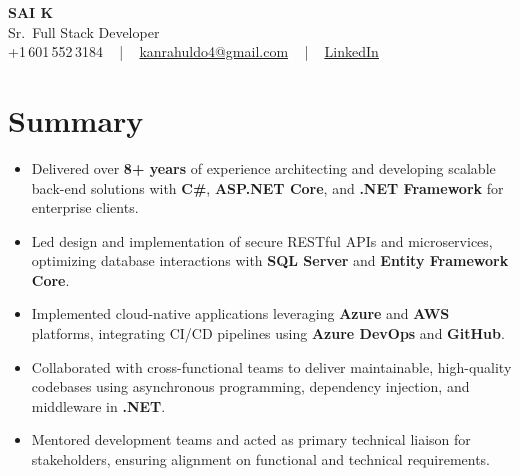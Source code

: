 \documentclass[letterpaper,11pt]{article}
\newcommand{\resumeItem}[1]{
  \item\footnotesize{
    {#1 \vspace{-2pt}}
  }
}
\newcommand{\resumeItemListStart}{\begin{itemize}[leftmargin=*]}
\newcommand{\resumeItemListEnd}{\end{itemize}\vspace{-5pt}}
\begin{document}
\begin{center}
    {\fontsize{14pt}{12pt}\selectfont \textbf{\MakeUppercase{Sai K}}}\\ \vspace{2pt}
    \fontsize{10pt}{12pt}\selectfont Sr.\ Full Stack Developer\\ \vspace{2pt}
    \fontsize{10pt}{12pt}\selectfont +1\,601\,552\,3184 ~ | ~
    \href{mailto:kanrahuldo4@gmail.com}{kanrahuldo4@gmail.com} ~ | ~
    \href{https://www.linkedin.com/in/srrrk/}{\color{blue}\underline{LinkedIn}}
    \vspace{-10pt}
\end{center}

\section{Summary}
\fontsize{9pt}{10pt}\selectfont
\resumeItemListStart
  \resumeItem{Delivered over \textbf{8+ years} of experience architecting and developing scalable back-end solutions with \textbf{C\#}, \textbf{ASP.NET Core}, and \textbf{.NET Framework} for enterprise clients.}
  \resumeItem{Led design and implementation of secure RESTful APIs and microservices, optimizing database interactions with \textbf{SQL Server} and \textbf{Entity Framework Core}.}
  \resumeItem{Implemented cloud-native applications leveraging \textbf{Azure} and \textbf{AWS} platforms, integrating CI/CD pipelines using \textbf{Azure DevOps} and \textbf{GitHub}.}
  \resumeItem{Collaborated with cross-functional teams to deliver maintainable, high-quality codebases using asynchronous programming, dependency injection, and middleware in \textbf{.NET}.}
  \resumeItem{Mentored development teams and acted as primary technical liaison for stakeholders, ensuring alignment on functional and technical requirements.}
\resumeItemListEnd
\vspace{-6pt}

\end{document}
